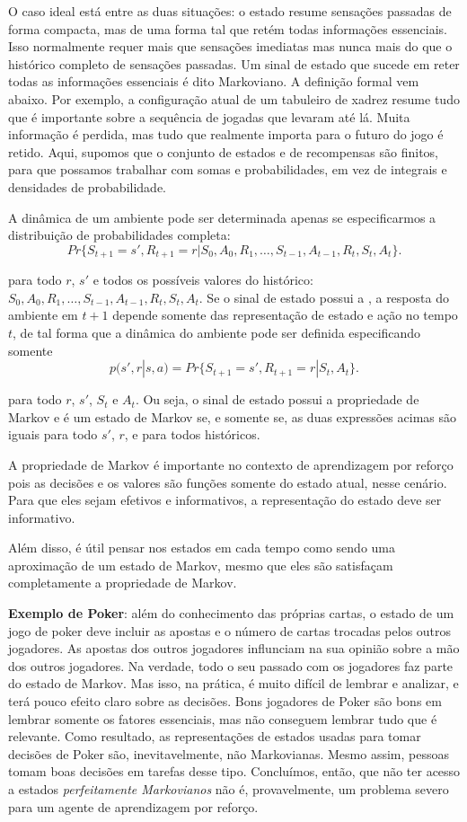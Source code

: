 \documentclass{article}
\begin{document}
O caso ideal está entre as duas situações: o estado resume sensações passadas de forma compacta, mas de uma forma tal que retém todas informações essenciais. Isso normalmente requer mais que sensações imediatas mas nunca mais do que o histórico completo de sensações passadas. Um sinal de estado que sucede em reter todas as informações essenciais é dito Markoviano. A definição formal vem abaixo. Por exemplo, a configuração atual de um tabuleiro de xadrez resume tudo que é importante sobre a sequência de jogadas que levaram até lá. Muita informação é perdida, mas tudo que realmente importa para o futuro do jogo é retido. Aqui, supomos que o conjunto de estados e de recompensas são finitos, para que possamos trabalhar com somas e probabilidades, em vez de integrais e densidades de probabilidade.

A dinâmica de um ambiente pode ser determinada apenas se especificarmos a distribuição de probabilidades completa: \[
  Pr\{S_{t+1} = s', R_{t+1} = r | S_0,A_0,R_1,\ldots,S_{t-1},A_{t-1},R_t,S_t,A_t\}
.\] 

para todo $r$, $s'$ e todos os possíveis valores do histórico: $S_0,A_0,R_1,\ldots,S_{t-1},A_{t-1},R_t,S_t,A_t$. Se o sinal de estado possui a , a resposta do ambiente em $t+1$ depende somente das representação de estado e ação no tempo $t$, de tal forma que a dinâmica do ambiente pode ser definida especificando somente \[
  p(s',r|s,a)=Pr\{S_{t+1}=s',R_{t+1}=r|S_t,A_t\}
.\] 

para todo $r$, $s'$, $S_t$ e $A_t$. Ou seja, o sinal de estado possui a propriedade de Markov e é um estado de Markov se, e somente se, as duas expressões acimas são iguais para todo $s'$, $r$, e para todos históricos.

A propriedade de Markov é importante no contexto de aprendizagem por reforço pois as decisões e os valores são funções somente do estado atual, nesse cenário. Para que eles sejam efetivos e informativos, a representação do estado deve ser informativo. 

Além disso, é útil pensar nos estados em cada tempo como sendo uma aproximação de um estado de Markov, mesmo que eles são satisfaçam completamente a propriedade de Markov.

\textbf{Exemplo de Poker}: além do conhecimento das próprias cartas, o estado de um jogo de poker deve incluir as apostas e o número de cartas trocadas pelos outros jogadores. As apostas dos outros jogadores influnciam na sua opinião sobre a mão dos outros jogadores. Na verdade, todo o seu passado com os jogadores faz parte do estado de Markov. 
Mas isso, na prática, é muito difícil de lembrar e analizar, e terá pouco efeito claro sobre as decisões. Bons jogadores de Poker são bons em lembrar somente os fatores essenciais, mas não conseguem lembrar tudo que é relevante. Como resultado, as representações de estados usadas para tomar decisões de Poker são, inevitavelmente, não Markovianas. Mesmo assim, pessoas tomam boas decisões em tarefas desse tipo. Concluímos, então, que não ter acesso a estados \textit{perfeitamente Markovianos} não é, provavelmente, um problema severo para um agente de aprendizagem por reforço.
\end{document}
